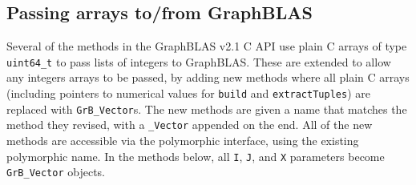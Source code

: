 \subsection{Passing arrays to/from GraphBLAS}
\label{ijxvector_methods}

Several of the methods in the GraphBLAS v2.1 C API use plain C arrays of type
\verb'uint64_t' to pass lists of integers to GraphBLAS.  These are extended to
allow any integers arrays to be passed, by adding new methods where all plain C
arrays (including pointers to numerical values for \verb'build' and
\verb'extractTuples') are replaced with \verb'GrB_Vector's.  The new methods
are given a name that matches the method they revised, with a \verb'_Vector'
appended on the end.  All of the new methods are accessible via the polymorphic
interface, using the existing polymorphic name.  In the methods below, all
\verb'I', \verb'J', and \verb'X' parameters become \verb'GrB_Vector' objects.

